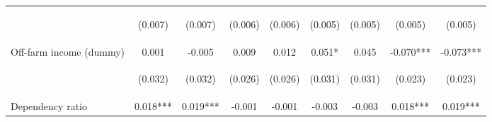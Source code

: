 \begin{center}
\begin{tabular}{lcccccccc}
\vspace{4pt} & \begin{footnotesize}(0.007)\end{footnotesize} & \begin{footnotesize}(0.007)\end{footnotesize} & \begin{footnotesize}(0.006)\end{footnotesize} & \begin{footnotesize}(0.006)\end{footnotesize} & \begin{footnotesize}(0.005)\end{footnotesize} & \begin{footnotesize}(0.005)\end{footnotesize} & \begin{footnotesize}(0.005)\end{footnotesize} & \begin{footnotesize}(0.005)\end{footnotesize} \\
Off-farm income (dummy) & 0.001 & -0.005 & 0.009 & 0.012 & 0.051* & 0.045 & -0.070*** & -0.073*** \\
\vspace{4pt} & \begin{footnotesize}(0.032)\end{footnotesize} & \begin{footnotesize}(0.032)\end{footnotesize} & \begin{footnotesize}(0.026)\end{footnotesize} & \begin{footnotesize}(0.026)\end{footnotesize} & \begin{footnotesize}(0.031)\end{footnotesize} & \begin{footnotesize}(0.031)\end{footnotesize} & \begin{footnotesize}(0.023)\end{footnotesize} & \begin{footnotesize}(0.023)\end{footnotesize} \\
Dependency ratio & 0.018*** & 0.019*** & -0.001 & -0.001 & -0.003 & -0.003 & 0.018*** & 0.019*** \\

\end{tabular}
\end{center}

